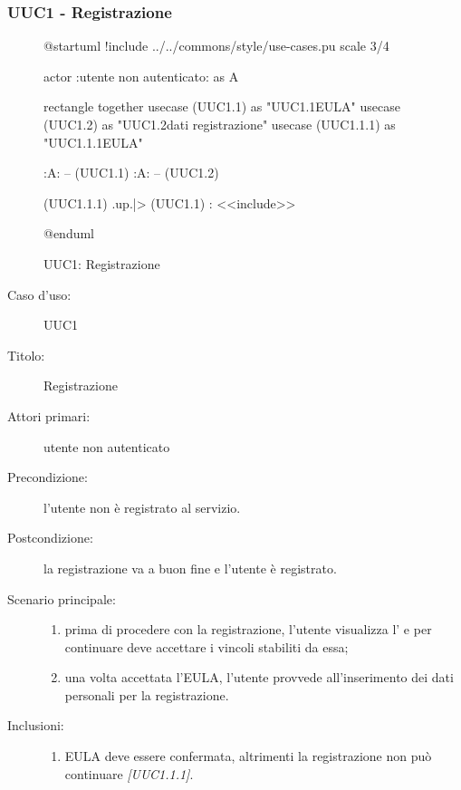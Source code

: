 \documentclass[../analisi-dei-requisiti.tex]{subfiles}
\begin{document}
\subsubsection{UUC1 - Registrazione}%
\label{subsub:UUC1utente}

\begin{figure}[h!]
  \centering
  \begin{plantuml}
  @startuml
  !include ../../commons/style/use-cases.pu
  scale 3/4

  actor :utente non autenticato: as A

  rectangle {
    together {
      usecase (UUC1.1) as "UUC1.1\nVisualizzazione EULA"
      usecase (UUC1.2) as "UUC1.2\nInserimento dati registrazione"
      usecase (UUC1.1.1) as "UUC1.1.1\nConferma EULA"
    }
  }

  :A: -- (UUC1.1)
  :A: -- (UUC1.2)

  (UUC1.1.1) .up.|> (UUC1.1) : <<include>>

  @enduml
  \end{plantuml}
  \caption{UUC1: Registrazione}
  \label{fig:uuc1}
\end{figure}

\begin{description}
  \item[Caso d’uso:] UUC1
  \item[Titolo:] Registrazione
  \item[Attori primari:] utente non autenticato
  \item[Precondizione:] l'utente non è registrato al servizio.
  \item[Postcondizione:] la registrazione va a buon fine e l'utente è registrato.
  \item[Scenario principale:]
        \begin{enumerate}
          \item prima di procedere con la registrazione, l'utente visualizza l' e per continuare deve accettare i vincoli stabiliti da essa;
          \item una volta accettata l'EULA, l'utente provvede all'inserimento dei dati personali per la registrazione.
        \end{enumerate}
  \item[Inclusioni:]
        \begin{enumerate}
          \item EULA deve essere confermata, altrimenti la registrazione non può continuare \emph{[UUC1.1.1]}.
        \end{enumerate}
\end{description}
\end{document}
